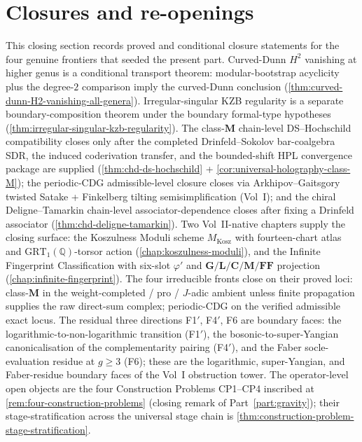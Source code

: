 \documentclass[11pt]{memoir}
\providecommand{\cref}[1]{\ref{#1}}
\newcommand{\Q}{\mathbb{Q}}
\begin{document}
\section*{Closures and re-openings}
\label{sec:closures-and-re-openings}
This closing section records proved and conditional closure
statements for the four genuine frontiers that seeded the present
part. Curved-Dunn $H^2$ vanishing at higher genus is a conditional
transport theorem: modular-bootstrap acyclicity plus the
degree-$2$ comparison imply the curved-Dunn conclusion
(\cref{thm:curved-dunn-H2-vanishing-all-genera}). Irregular-singular
KZB regularity is a separate boundary-composition theorem under
the boundary formal-type hypotheses
(\cref{thm:irregular-singular-kzb-regularity}). The
class-$\mathbf{M}$ chain-level DS--Hochschild compatibility closes
only after the completed Drinfeld--Sokolov bar-coalgebra SDR,
the induced coderivation transfer, and the bounded-shift HPL
convergence package are supplied
(\cref{thm:chd-ds-hochschild} +
\cref{cor:universal-holography-class-M}); the periodic-CDG
admissible-level closure closes via Arkhipov--Gaitsgory twisted
Satake + Finkelberg tilting semisimplification (Vol~I); and the
chiral Deligne--Tamarkin chain-level associator-dependence closes
after fixing a Drinfeld associator
(\cref{thm:chd-deligne-tamarkin}). Two
Vol~II-native chapters supply the closing surface:
the Koszulness Moduli scheme
$M_{\mathrm{Kosz}}$ with fourteen-chart atlas and
$\mathrm{GRT}_1(\Q)$-torsor action
(\cref{chap:koszulness-moduli}), and the Infinite Fingerprint
Classification with six-slot $\varphi'$ and $\mathbf{G/L/C/M/FF}$
projection (\cref{chap:infinite-fingerprint}). The four
irreducible fronts close on their proved loci: class-$\mathbf{M}$
in the weight-completed / pro / $J$-adic ambient unless finite
propagation supplies the raw direct-sum complex; periodic-CDG on
the verified admissible exact locus. The residual three directions
F1$'$, F4$'$, F6 are boundary faces: the
logarithmic-to-non-logarithmic transition (F1$'$), the
bosonic-to-super-Yangian canonicalisation of the complementarity
pairing (F4$'$), and the Faber socle-evaluation residue at $g \ge 3$
	(F6); these are the logarithmic, super-Yangian, and Faber-residue
	boundary faces of the Vol~I obstruction tower. The operator-level
	open objects are the
four Construction Problems CP1--CP4 inscribed at
\cref{rem:four-construction-problems} (closing remark of
Part~\ref{part:gravity}); their stage-stratification across the
universal stage chain is
\cref{thm:construction-problem-stage-stratification}.
\end{document}
